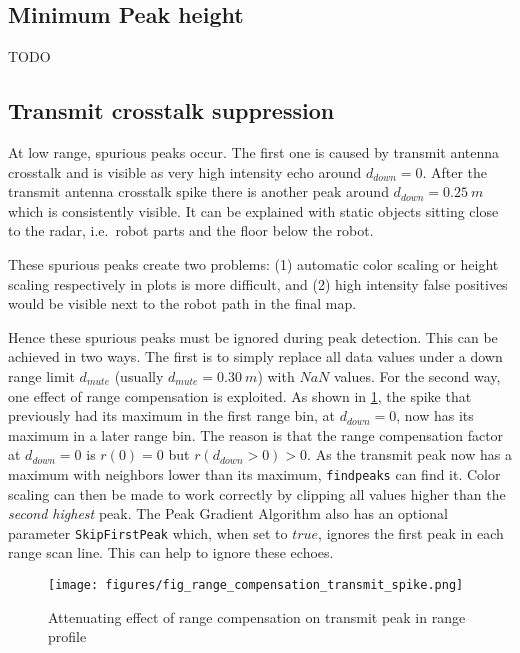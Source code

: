\subsection{Minimum Peak height}\label{minimum-peak-height}
TODO

\subsection{Transmit crosstalk suppression}\label{transmit-crosstalk-suppression}

At low range, spurious peaks occur. The first one is caused by transmit
antenna crosstalk and is visible as very high intensity echo around
\(d_{down}=0\). After the transmit antenna crosstalk spike there is
another peak around \(d_{down}=\SI{0.25}{m}\) which is consistently visible. It
can be explained with static objects sitting close to the radar,
i.e.~robot parts and the floor below the robot.

These spurious peaks create two problems: (1) automatic color scaling or
height scaling respectively in plots is more difficult, and (2) high
intensity false positives would be visible next to the robot path in the
final map.

Hence these spurious peaks must be ignored during peak detection. This
can be achieved in two ways. The first is to simply replace all data
values under a down range limit \(d_{mute}\) (usually
\(d_{mute}=\SI{0.30}{m}\)) with \(NaN\) values. For the second way, one effect
of range compensation is exploited. As shown in \cref{fig:fig_range_compensation_transmit_spike}, the spike
that previously had its maximum in the first range bin, at
\(d_{down}=0\), now has its maximum in a later range bin. The reason is
that the range compensation factor at \(d_{down}=0\) is \(r(0) = 0\) but
\(r(d_{down}>0) > 0\). As the transmit peak now has a maximum with
neighbors lower than its maximum, \texttt{findpeaks} can find it. Color
scaling can then be made to work correctly by clipping all values higher
than the \emph{second highest} peak. The Peak Gradient Algorithm also
has an optional parameter \texttt{SkipFirstPeak} which, when set to
\(true\), ignores the first peak in each range scan line. This can help
to ignore these echoes.

\begin{figure}[htbp]
    \centering
    \texttt{[image: figures/fig\_range\_compensation\_transmit\_spike.png]}
    \caption{Attenuating effect of range compensation on transmit peak in range profile}
    \label{fig:fig_range_compensation_transmit_spike}
\end{figure}

